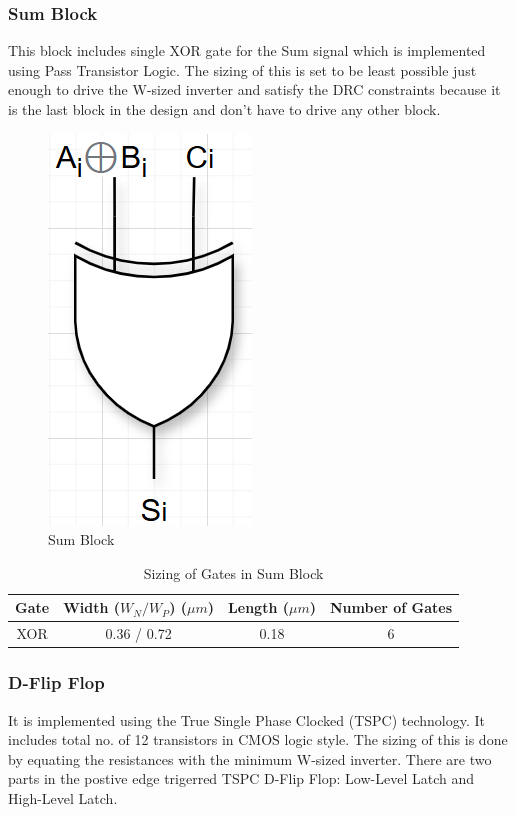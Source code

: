 \documentclass[conference]{IEEEtran}
\begin{document}
\subsubsection{Sum Block}
This block includes single XOR gate for the Sum signal which is implemented using Pass Transistor Logic. The sizing of this is set to be least possible just enough to drive the W-sized inverter and satisfy the DRC constraints because it is the last block in the design and don't have to drive any other block.

\begin{figure}[H]
    \centering
    \includegraphics[width=0.2\linewidth]{sumcir.png}
    \caption{Sum Block}
    \label{fig:sum_block}
\end{figure}

\begin{table}[H]
\centering
\caption{Sizing of Gates in Sum Block}
\begin{tabular}{|c|c|c|c|}
\hline
\rowcolor{cyan!10}

\textbf{Gate} & \textbf{Width ($W_N / W_P$) ($\mu m$)} & \textbf{Length ($\mu m$)} & \textbf{Number of Gates} \\ \hline
XOR          & 0.36 / 0.72      & 0.18         & 6        \\ \hline
\end{tabular}
\label{tab:sum_block}
\end{table}

\subsubsection{D-Flip Flop}
It is implemented using the True Single Phase Clocked (TSPC) technology. It includes total no. of 12 transistors in CMOS logic style. The sizing of this is done by equating the resistances with the minimum W-sized inverter. There are two parts in the postive edge trigerred TSPC D-Flip Flop: Low-Level Latch and High-Level Latch.
\end{document}
